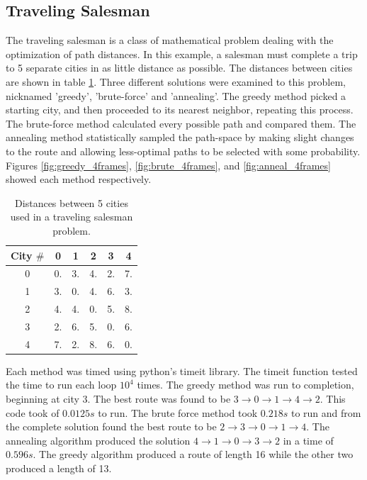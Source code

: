 \documentclass[twocolumn]{article}
\begin{document}
\subsection{Traveling Salesman}
The traveling salesman is a class of mathematical problem dealing with the optimization of path distances. In this example, a salesman must complete a trip to 5 separate cities in as little distance as possible. The distances between cities are shown in table \ref{tab:5cities}. Three different solutions were examined to this problem, nicknamed 'greedy', 'brute-force' and 'annealing'. The greedy method picked a starting city, and then proceeded to its nearest neighbor, repeating this process. The brute-force method calculated every possible path and compared them. The annealing method statistically sampled the path-space by making slight changes to the route and allowing less-optimal paths to be selected with some probability. Figures \ref{fig:greedy_4frames}, \ref{fig:brute_4frames}, and \ref{fig:anneal_4frames} showed each method respectively. 
\begin{table}
\begin{center}
	\begin{tabular}{|c|c|c|c|c|c|}
		\hline
		City $\#$ & 0 & 1 & 2 & 3 & 4 \\
		\hline
		0 & 0. & 3. & 4. & 2. & 7. \\
		\hline
		1 & 3. & 0. & 4. & 6. & 3. \\
		\hline
		2 & 4. & 4. & 0. & 5. & 8. \\
		\hline
		3 & 2. & 6. & 5. & 0. & 6. \\
		\hline
		4 & 7. & 2. & 8. & 6. & 0. \\
		\hline
	\end{tabular}
	\caption{Distances between 5 cities used in a traveling salesman problem.}
	\label{tab:5cities}
\end{center}
\end{table}

Each method was timed using python's timeit library. The timeit function tested the time to run each loop $10^4$ times. The greedy method was run to completion, beginning at city 3. The best route was found to be $3 \to 0 \to 1 \to 4 \to 2$. This code took of $0.0125s$ to run. The brute force method took $0.218s$ to run and from the complete solution found the best route to be $2 \to 3 \to 0 \to 1 \to 4$. The annealing algorithm produced the solution $4 \to 1 \to 0 \to 3 \to 2$ in a time of $0.596s$. The greedy algorithm produced a route of length 16 while the other two produced a length of 13.
\end{document}
